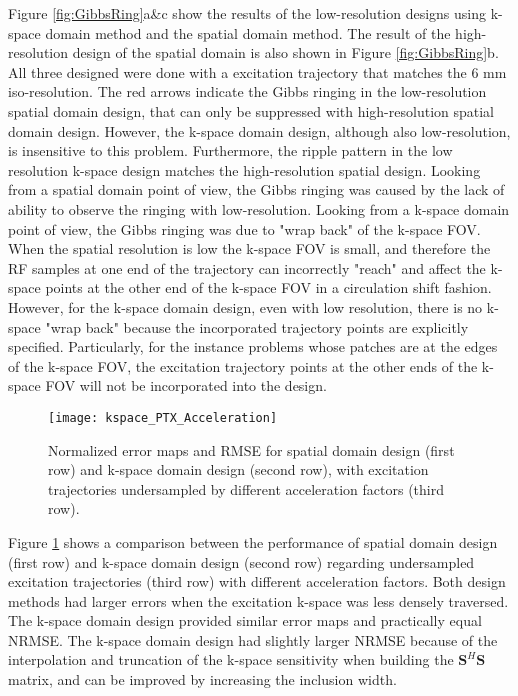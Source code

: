 Figure \ref{fig:GibbsRing}a\&c show the results of the  low-resolution designs using k-space domain method and the spatial domain method. The result of the high-resolution design of the spatial domain is also shown in Figure \ref{fig:GibbsRing}b. All three designed were done with a excitation trajectory that matches the 6 mm iso-resolution. The red arrows indicate the Gibbs ringing in the low-resolution spatial domain design, that can only be suppressed with high-resolution spatial domain design. However, the k-space domain design, although also low-resolution, is insensitive to this problem. Furthermore, the ripple pattern in the low resolution k-space design matches the high-resolution spatial design. Looking from a spatial domain point of view, the Gibbs ringing was caused by the lack of ability to observe the ringing with low-resolution. Looking from a k-space domain point of view, the Gibbs ringing was due to "wrap back" of the k-space FOV. When the spatial resolution is low the k-space FOV is small, and therefore the RF samples at one end of the trajectory can incorrectly "reach" and affect the k-space points at the other end of the k-space FOV in a circulation shift fashion. However, for the k-space domain design, even with low resolution, there is no k-space "wrap back" because the incorporated trajectory points are explicitly specified. Particularly, for the instance problems whose patches are at the edges of the k-space FOV, the excitation trajectory points at the other ends of the k-space FOV will not be incorporated into the design.    


\begin{figure}
	\centering
	\texttt{[image: kspace\_PTX\_Acceleration]}
	\caption{ Normalized error maps and RMSE for spatial domain design (first row) and k-space domain design (second row), with excitation trajectories undersampled by different acceleration factors (third row).}
	\label{fig:kspace_PTX_Acceleration}
\end{figure}

Figure \ref{fig:kspace_PTX_Acceleration} shows a comparison between the performance of spatial domain design (first row) and k-space domain design (second row) regarding undersampled excitation trajectories (third row) with different acceleration factors. Both design methods had larger errors when the excitation k-space was less densely traversed. The k-space domain design provided similar error maps and practically equal NRMSE. The k-space domain design had slightly larger NRMSE because of the interpolation and truncation of the k-space sensitivity when building the $\mathbf{S}^{H}\mathbf{S}$ matrix, and can be improved by increasing the inclusion width. 


